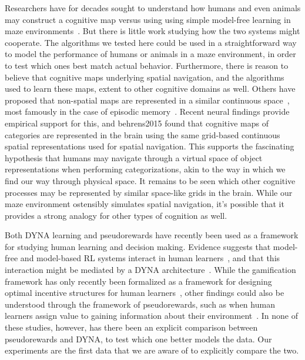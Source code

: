 \documentclass[notitlepage]{article}
\begin{document}
Researchers have for decades sought to understand how humans and even animals may construct a cognitive map versus using using simple model-free learning in maze environments~\cite{tolman1948cognitive}. But there is little work studying how the two systems might cooperate. The algorithms we tested here could be used in a straightforward way to model the performance of humans or animals in a maze environment, in order to test which ones best match actual behavior. Furthermore, there is reason to believe that cognitive maps underlying spatial navigation, and the algorithms used to learn these maps, extent to other cognitive domains as well. Others have proposed that non-spatial maps are represented in a similar continuous space~\cite{buzsaki2013memory,tolman1948cognitive}, most famously in the case of episodic memory~\cite{o1978hippocampus}. Recent neural findings provide empirical support for this, and {behrens2015} found that cognitive maps of categories are represented in the brain using the same grid-based continuous spatial representations used for spatial navigation. This supports the fascinating hypothesis that humans may navigate through a virtual space of object representations when performing categorizations, akin to the way in which we find our way through physical space. It remains to be seen which other cognitive processes may be represented by similar space-like grids in the brain. While our maze environment ostensibly simulates spatial navigation, it's possible that it provides a strong analogy for other types of cognition as well.

Both DYNA learning and pseudorewards have recently been used as a framework for studying human learning and decision making. Evidence suggests that model-free and model-based RL systems interact in human learners~\cite{otto2013working,otto2013curse}, and that this interaction might be mediated by a DYNA architecture~\cite{gershman2014retrospective}. While the gamification framework has only recently been formalized as a framework for designing optimal incentive structures for human learners~\cite{lieder2016helping}, other findings could also be understood through the framework of pseudorewards, such as when human learners assign value to gaining information about their environment~\cite{wilson2014humans}. In none of these studies, however, has there been an explicit comparison between pseudorewards and DYNA, to test which one better models the data. Our experiments are the first data that we are aware of to explicitly compare the two.
\end{document}
